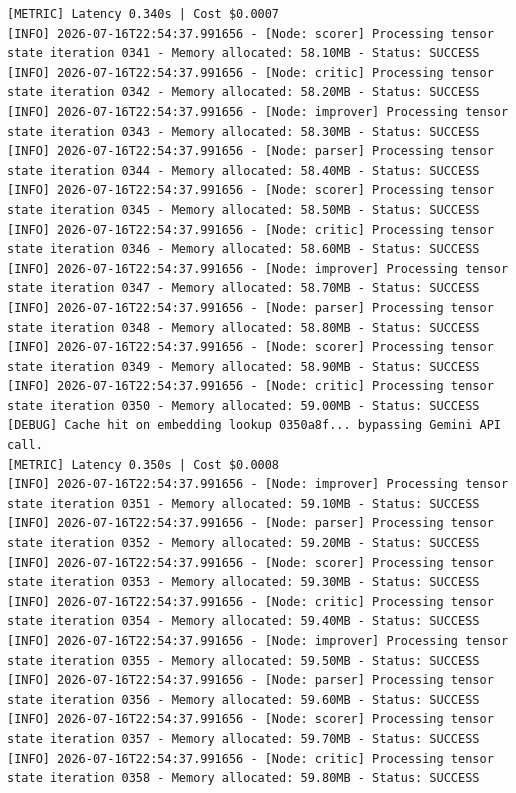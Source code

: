 \documentclass[10pt,journal,compsoc]{IEEEtran}
\begin{document}
\begin{verbatim}
[METRIC] Latency 0.340s | Cost $0.0007
[INFO] 2026-07-16T22:54:37.991656 - [Node: scorer] Processing tensor state iteration 0341 - Memory allocated: 58.10MB - Status: SUCCESS
[INFO] 2026-07-16T22:54:37.991656 - [Node: critic] Processing tensor state iteration 0342 - Memory allocated: 58.20MB - Status: SUCCESS
[INFO] 2026-07-16T22:54:37.991656 - [Node: improver] Processing tensor state iteration 0343 - Memory allocated: 58.30MB - Status: SUCCESS
[INFO] 2026-07-16T22:54:37.991656 - [Node: parser] Processing tensor state iteration 0344 - Memory allocated: 58.40MB - Status: SUCCESS
[INFO] 2026-07-16T22:54:37.991656 - [Node: scorer] Processing tensor state iteration 0345 - Memory allocated: 58.50MB - Status: SUCCESS
[INFO] 2026-07-16T22:54:37.991656 - [Node: critic] Processing tensor state iteration 0346 - Memory allocated: 58.60MB - Status: SUCCESS
[INFO] 2026-07-16T22:54:37.991656 - [Node: improver] Processing tensor state iteration 0347 - Memory allocated: 58.70MB - Status: SUCCESS
[INFO] 2026-07-16T22:54:37.991656 - [Node: parser] Processing tensor state iteration 0348 - Memory allocated: 58.80MB - Status: SUCCESS
[INFO] 2026-07-16T22:54:37.991656 - [Node: scorer] Processing tensor state iteration 0349 - Memory allocated: 58.90MB - Status: SUCCESS
[INFO] 2026-07-16T22:54:37.991656 - [Node: critic] Processing tensor state iteration 0350 - Memory allocated: 59.00MB - Status: SUCCESS
[DEBUG] Cache hit on embedding lookup 0350a8f... bypassing Gemini API call.
[METRIC] Latency 0.350s | Cost $0.0008
[INFO] 2026-07-16T22:54:37.991656 - [Node: improver] Processing tensor state iteration 0351 - Memory allocated: 59.10MB - Status: SUCCESS
[INFO] 2026-07-16T22:54:37.991656 - [Node: parser] Processing tensor state iteration 0352 - Memory allocated: 59.20MB - Status: SUCCESS
[INFO] 2026-07-16T22:54:37.991656 - [Node: scorer] Processing tensor state iteration 0353 - Memory allocated: 59.30MB - Status: SUCCESS
[INFO] 2026-07-16T22:54:37.991656 - [Node: critic] Processing tensor state iteration 0354 - Memory allocated: 59.40MB - Status: SUCCESS
[INFO] 2026-07-16T22:54:37.991656 - [Node: improver] Processing tensor state iteration 0355 - Memory allocated: 59.50MB - Status: SUCCESS
[INFO] 2026-07-16T22:54:37.991656 - [Node: parser] Processing tensor state iteration 0356 - Memory allocated: 59.60MB - Status: SUCCESS
[INFO] 2026-07-16T22:54:37.991656 - [Node: scorer] Processing tensor state iteration 0357 - Memory allocated: 59.70MB - Status: SUCCESS
[INFO] 2026-07-16T22:54:37.991656 - [Node: critic] Processing tensor state iteration 0358 - Memory allocated: 59.80MB - Status: SUCCESS

\end{verbatim}
\end{document}
